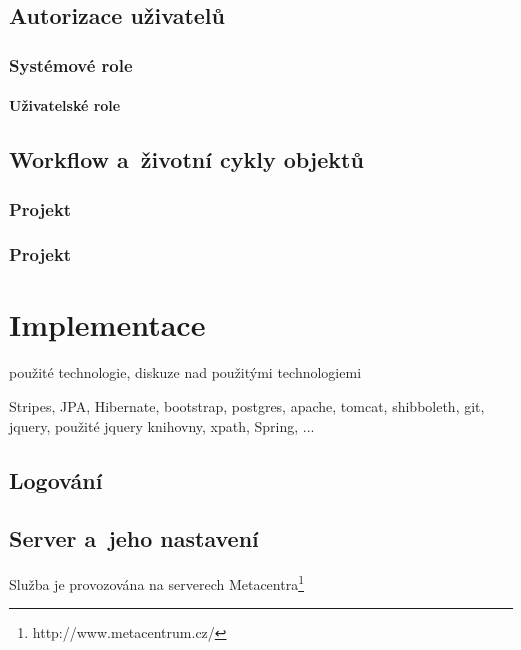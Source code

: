 \section{Autorizace uživatelů}


\subsection{Systémové role}
\subsubsection{Uživatelské role}

\section{Workflow a~životní cykly objektů}

\subsection{Projekt}

\subsection{Projekt}



\chapter{Implementace}
použité technologie, diskuze nad použitými technologiemi

Stripes, JPA, Hibernate, bootstrap, postgres, apache, tomcat, shibboleth, 
git, jquery, použité jquery knihovny, xpath, Spring, ... 

\section{Logování}

\section{Server a~jeho nastavení}
Služba je provozována na serverech Metacentra\footnote{http://www.metacentrum.cz/}


